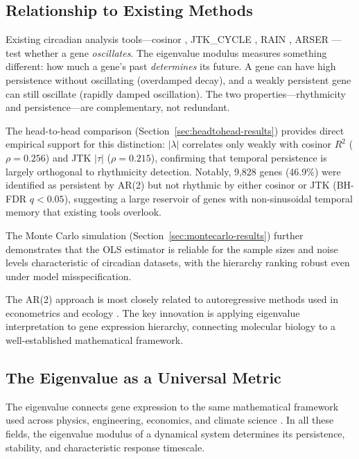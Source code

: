 \documentclass[11pt,letterpaper]{article}
\begin{document}
\subsection{Relationship to Existing Methods}

Existing circadian analysis tools---cosinor \citep{cornelissen2014cosinor}, JTK\_CYCLE \citep{hughes2010jtk}, RAIN \citep{thaben2014detecting}, ARSER \citep{yang2010analyzing}---test whether a gene \textit{oscillates}. The eigenvalue modulus measures something different: how much a gene's past \textit{determines} its future. A gene can have high persistence without oscillating (overdamped decay), and a weakly persistent gene can still oscillate (rapidly damped oscillation). The two properties---rhythmicity and persistence---are complementary, not redundant.

The head-to-head comparison (Section~\ref{sec:headtohead-results}) provides direct empirical support for this distinction: $|\lambda|$ correlates only weakly with cosinor $R^2$ ($\rho = 0.256$) and JTK $|\tau|$ ($\rho = 0.215$), confirming that temporal persistence is largely orthogonal to rhythmicity detection. Notably, 9,828 genes (46.9\%) were identified as persistent by AR(2) but not rhythmic by either cosinor or JTK (BH-FDR $q < 0.05$), suggesting a large reservoir of genes with non-sinusoidal temporal memory that existing tools overlook.

The Monte Carlo simulation (Section~\ref{sec:montecarlo-results}) further demonstrates that the OLS estimator is reliable for the sample sizes and noise levels characteristic of circadian datasets, with the hierarchy ranking robust even under model misspecification.

The AR(2) approach is most closely related to autoregressive methods used in econometrics \citep{hamilton1994time, lutkepohl2005new} and ecology \citep{ives2003estimating}. The key innovation is applying eigenvalue interpretation to gene expression hierarchy, connecting molecular biology to a well-established mathematical framework.

\subsection{The Eigenvalue as a Universal Metric}

The eigenvalue connects gene expression to the same mathematical framework used across physics, engineering, economics, and climate science \citep{strogatz2015nonlinear}. In all these fields, the eigenvalue modulus of a dynamical system determines its persistence, stability, and characteristic response timescale.
\end{document}

